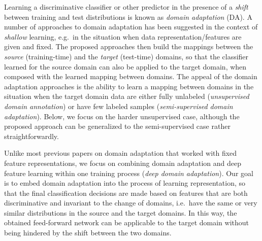 
Learning a discriminative classifier or other predictor in the presence of a {\em shift} between training and test distributions is known as {\em domain adaptation} (DA). A number of approaches to domain adaptation has been suggested in the context of {\em shallow} learning, e.g.\ in the situation when data representation/features are given and fixed. The proposed approaches then build the mappings between the {\em source} (training-time) and the {\em target} (test-time) domains, so that the classifier learned for the source domain can also be applied to the target domain, when composed with the learned mapping between domains. The appeal of the domain adaptation approaches is the ability to learn a mapping between domains in the situation when the target domain data are either fully unlabeled ({\em unsupervised domain annotation}) or have few labeled samples ({\em semi-supervised domain adaptation}). Below, we focus on the harder unsupervised case, although the proposed approach can be generalized to the semi-supervised case rather straightforwardly.

Unlike most previous papers on domain adaptation that worked with fixed feature representations, we focus on combining domain adaptation and deep feature learning within one training process ({\em deep domain adaptation}). Our goal is to embed domain adaptation into the process of learning representation, so that the final classification decisions are made based on features that are both discriminative and invariant to the change of domains, i.e.\ have the same or very similar distributions in the source and the target domains. In this way, the obtained feed-forward network can be applicable to the target domain without being hindered by the shift between the two domains.

